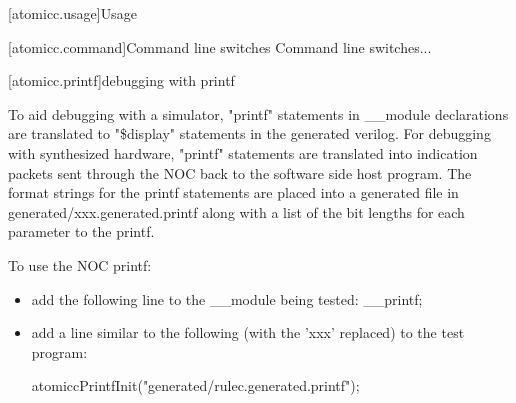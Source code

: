[atomicc.usage]{Usage}

[atomicc.command]{Command line switches}
Command line switches...

[atomicc.printf]{debugging with printf}

To aid debugging with a simulator, "printf" statements in __module declarations are
translated to "\$display" statements in the generated verilog.
For debugging with synthesized hardware, "printf" statements are translated into
indication packets sent through the NOC back to the software side host program.
The format strings for the printf statements are placed into a generated file
in generated/xxx.generated.printf along with a list of the bit lengths for each
parameter to the printf.

To use the NOC printf:
\begin{itemize}
\item add the following line to the __module being tested: __printf;
\item add a line similar to the following (with the 'xxx' replaced) to the test program:

\begin{example}
\begin{codeblock}
           atomiccPrintfInit("generated/rulec.generated.printf");
\end{codeblock}
\end{example}
\end{itemize}

\begin{bnf}
\br
\end{bnf}
